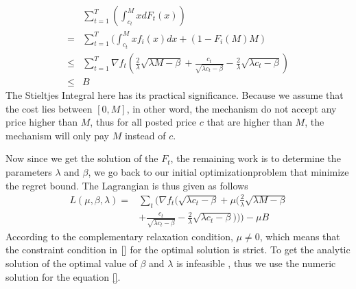 \documentclass[10pt,conference,compsocconf,letterpaper]{IEEEtran}
\begin{document}
\begin{equation*}
\begin{aligned}
&\sum_{t=1}^T(\int_{c_t}^MxdF_t(x))\\
=&\sum_{t=1}^T(\int_{c_t}^Mxf_i(x)dx+(1-F_i(M)M)\\
\leq &\sum_{t=1}^T\nabla f_t (\frac{2}{\lambda}\sqrt{\lambda M-\beta}+\frac{c_t}{\sqrt{\lambda c_t-\beta}}-\frac{2}{\lambda}\sqrt{\lambda c_t-\beta})\\
\leq &B
\end{aligned}
\end{equation*}
The Stieltjes Integral here has its practical significance. Because we assume that the cost lies between $[0,M]$, in other word, the mechanism do not accept any price higher than $M$, thus for all posted price $c$ that are higher than $M$, the mechanism will only pay $M$ instead of $c$.


Now since we get the solution of the $F_t$, the remaining work is to determine the parameters $\lambda$ and $\beta$, we go back to our initial optimizationproblem that minimize the regret bound. The Lagrangian is thus given as follows
\begin{equation}
\begin{aligned}
L(\mu,\beta,\lambda)=&\sum_t \bigg( \nabla f_t\Big( \sqrt{\lambda c_t-\beta}+\mu \big(\frac{2}{\lambda}\sqrt{\lambda M-\beta}\\
&+\frac{c_t}{\sqrt{\lambda c_t-\beta}}-\frac{2}{\lambda}\sqrt{\lambda c_t-\beta}\big)\Big)\bigg)-\mu B
\end{aligned}
\end{equation}
According to the complementary relaxation condition, $\mu\neq 0$, which means that the constraint condition in $\ref{}$ for the optimal solution is strict. 
To get the analytic solution of the optimal value of $\beta$ and $\lambda$ is infeasible , thus we use the numeric solution for the equation \ref{}.
\end{document}
